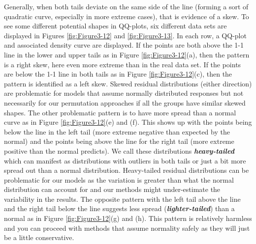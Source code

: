 \documentclass[]{book}
\begin{document}
Generally, when both tails deviate on the same side of the line (forming
a sort of quadratic curve, especially in more extreme cases), that is
evidence of a skew. To see some different potential shapes in QQ-plots,
six different data sets are displayed in Figures \ref{fig:Figure3-12}
and \ref{fig:Figure3-13}. In each row, a QQ-plot and associated density
curve are displayed. If the points are both above the 1-1 line in the
lower and upper tails as in Figure \ref{fig:Figure3-12}(a), then the
pattern is a right skew, here even more extreme than in the real data
set. If the points are below the 1-1 line in both tails as in Figure
\ref{fig:Figure3-12}(c), then the pattern is identified as a left skew.
Skewed residual distributions (either direction) are problematic for
models that assume normally distributed responses but not necessarily
for our permutation approaches if all the groups have similar skewed
shapes. The other problematic pattern is to have more spread than a
normal curve as in Figure \ref{fig:Figure3-12}(e) and (f). This shows up
with the points being below the line in the left tail (more extreme
negative than expected by the normal) and the points being above the
line for the right tail (more extreme positive than the normal
predicts). We call these distributions \textbf{\emph{heavy-tailed}}
which can manifest as distributions with outliers in both tails or just
a bit more spread out than a normal distribution. Heavy-tailed residual
distributions can be problematic for our models as the variation is
greater than what the normal distribution can account for and our
methods might under-estimate the variability in the results. The
opposite pattern with the left tail above the line and the right tail
below the line suggests less spread (\textbf{\emph{lighter-tailed}})
than a normal as in Figure \ref{fig:Figure3-12}(g) and (h). This pattern
is relatively harmless and you can proceed with methods that assume
normality safely as they will just be a little conservative.
\end{document}
